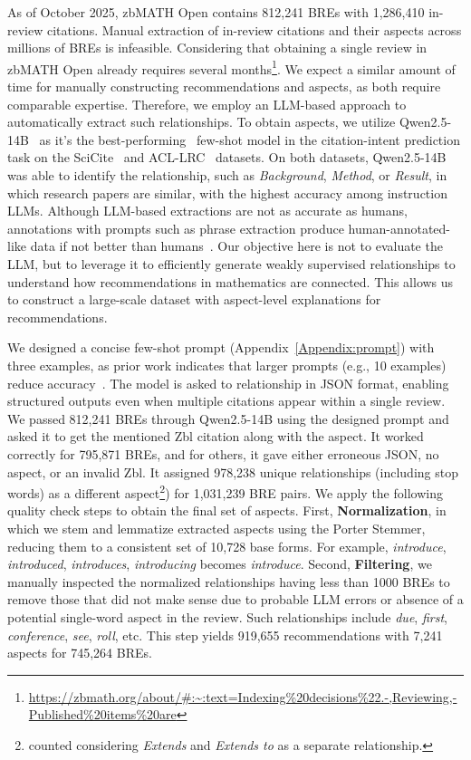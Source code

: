 \documentclass[sigconf,anonymous]{acmart}
\begin{document}
As of October 2025, zbMATH Open contains 812,241 BREs with 1,286,410 in-review citations.
Manual extraction of in-review citations and their aspects across millions of BREs is infeasible.
Considering that obtaining a single review in zbMATH Open already requires several months\footnote{\url{https://zbmath.org/about/\#:~:text=Indexing\%20decisions\%22.-,Reviewing,-Published\%20items\%20are}}.
We expect a similar amount of time for manually constructing recommendations and aspects, as both require comparable expertise.
Therefore, we employ an LLM-based approach to automatically extract such relationships.
To obtain aspects, we utilize Qwen2.5-14B~\cite{qwen2025qwen25technicalreport} as it's the best-performing~\cite{koloveas2025can} few-shot model in the citation-intent prediction task on the SciCite~\cite{cohan2019structural} and ACL-LRC~\cite{Jurgens2018ACLARC} datasets.
On both datasets, Qwen2.5-14B was able to identify the relationship, such as \textit{Background}, \textit{Method}, or \textit{Result}, in which research papers are similar, with the highest accuracy among instruction LLMs.
Although LLM-based extractions are not as accurate as humans, annotations with prompts such as phrase extraction produce human-annotated-like data if not better than humans~\cite{horych-etal-2025-promises,tan-etal-2024-large,qin-etal-2023-chatgpt}.
Our objective here is not to evaluate the LLM, but to leverage it to efficiently generate weakly supervised relationships to understand how recommendations in mathematics are connected.
This allows us to construct a large-scale dataset with aspect-level explanations for recommendations.

We designed a concise few-shot prompt (Appendix~\ref{Appendix:prompt}) with three examples, as prior work indicates that larger prompts (e.g., 10 examples) reduce accuracy~\cite{koloveas2025can}. 
The model is asked to relationship in JSON format, enabling structured outputs even when multiple citations appear within a single review.
We passed 812,241 BREs through Qwen2.5-14B using the designed prompt and asked it to get the mentioned Zbl citation along with the aspect.
It worked correctly for 795,871 BREs, and for others, it gave either erroneous JSON, no aspect, or an invalid Zbl.  
It assigned 978,238 unique relationships (including stop words) as a different aspect\footnote{counted considering \textit{Extends} and \textit{Extends to} as a separate relationship.}) for 1,031,239 BRE pairs.
We apply the following quality check steps to obtain the final set of aspects.
First, \textbf{Normalization}, in which we stem and lemmatize extracted aspects using the Porter Stemmer, reducing them to a consistent set of 10,728 base forms.
For example, \textit{introduce}, \textit{introduced}, \textit{introduces}, \textit{introducing} becomes \textit{introduce}.
Second, \textbf{Filtering}, we manually inspected the normalized relationships having less than 1000 BREs to remove those that did not make sense due to probable LLM errors or absence of a potential single-word aspect in the review. 
Such relationships include \textit{due}, \textit{first}, \textit{conference}, \textit{see}, \textit{roll}, etc. 
This step yields 919,655 recommendations with 7,241 aspects for 745,264 BREs.
\end{document}
